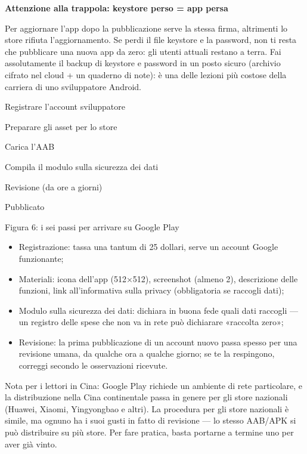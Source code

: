 \textbf{Attenzione alla trappola: keystore perso = app persa}\par

Per aggiornare l'app dopo la pubblicazione serve la stessa firma, altrimenti lo store rifiuta l'aggiornamento. Se perdi il file keystore e la password, non ti resta che pubblicare una nuova app da zero: gli utenti attuali restano a terra. Fai assolutamente il backup di keystore e password in un posto sicuro (archivio cifrato nel cloud + un quaderno di note): è una delle lezioni più costose della carriera di uno sviluppatore Android.


Registrare l'account sviluppatore

Preparare gli asset per lo store

Carica l'AAB

Compila il modulo sulla sicurezza dei dati

Revisione (da ore a giorni)

Pubblicato

\begin{center}\small\color{gray}Figura 6: i sei passi per arrivare su Google Play\end{center}

\begin{itemize}
  \item Registrazione: tassa una tantum di 25 dollari, serve un account Google funzionante;
  \item Materiali: icona dell'app (512×512), screenshot (almeno 2), descrizione delle funzioni, link all'informativa sulla privacy (obbligatoria se raccogli dati);
  \item Modulo sulla sicurezza dei dati: dichiara in buona fede quali dati raccogli — un registro delle spese che non va in rete può dichiarare «raccolta zero»;
  \item Revisione: la prima pubblicazione di un account nuovo passa spesso per una revisione umana, da qualche ora a qualche giorno; se te la respingono, correggi secondo le osservazioni ricevute.
\end{itemize}

Nota per i lettori in Cina: Google Play richiede un ambiente di rete particolare, e la distribuzione nella Cina continentale passa in genere per gli store nazionali (Huawei, Xiaomi, Yingyongbao e altri). La procedura per gli store nazionali è simile, ma ognuno ha i suoi gusti in fatto di revisione — lo stesso AAB/APK si può distribuire su più store. Per fare pratica, basta portarne a termine uno per aver già vinto.

